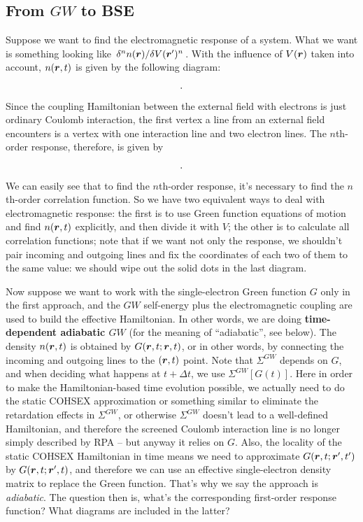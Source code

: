 \documentclass[hyperref, a4paper, 12pt]{report}
\newcommand*{\concept}[1]{{\textbf{#1}}}
\begin{document}
\subsection{From $GW$ to BSE}

Suppose we want to find the electromagnetic response of a system. 
What we want is something looking like $\fdv*[n]{n(\vb*{r})}{V(\vb*{r}')}$.
With the influence of $V(\vb*{r})$ taken into account, 
$n(\vb*{r}, t)$ is given by the following diagram: 
\[
    \protect.
\]
Since the coupling Hamiltonian between the external field with electrons 
is just ordinary Coulomb interaction, 
the first vertex a line from an external field encounters 
is a vertex with one interaction line and two electron lines.
The $n$th-order response, therefore, is given by 
\[
    \protect.
\]
We can easily see that to find the $n$th-order response,
it's necessary to find the $n$th-order correlation function.
So we have two equivalent ways to deal with electromagnetic response: 
the first is to use Green function equations of motion 
and find $n(\vb*{r}, t)$ explicitly,
and then divide it with $V$;
the other is to calculate all correlation functions;
note that if we want not only the response, 
we shouldn't pair incoming and outgoing lines 
and fix the coordinates of each two of them to the same value:
we should wipe out the solid dots in the last diagram.

Now suppose we want to work with the single-electron Green function $G$ only
in the first approach,
and the $GW$ self-energy plus the electromagnetic coupling 
are used to build the effective Hamiltonian. 
In other words, we are doing \concept{time-dependent adiabatic $GW$} 
(for the meaning of ``adiabatic'', see below).
The density $n(\vb*{r}, t)$ is obtained by $G(\vb*{r}, t; \vb*{r}, t)$,
or in other words, 
by connecting the incoming and outgoing lines to the $(\vb*{r}, t)$ point.
Note that $\Sigma^{GW}$ depends on $G$,
and when deciding what happens at $t + \Delta t$,
we use $\Sigma^{GW}[G(t)]$.
Here in order to make the Hamiltonian-based time evolution possible, 
we actually need to do the static COHSEX approximation or something similar 
to eliminate the retardation effects in $\Sigma^{GW}$,
or otherwise $\Sigma^{GW}$ doesn't lead to a well-defined Hamiltonian,
and therefore the screened Coulomb interaction line is no longer 
simply described by RPA
-- but anyway it relies on $G$.
Also, the locality of the static COHSEX Hamiltonian in time 
means we need to approximate $G(\vb*{r}, t; \vb*{r}', t')$
by $G(\vb*{r}, t; \vb*{r}', t)$,
and therefore we can use an effective single-electron density matrix 
to replace the Green function.
That's why we say the approach is \emph{adiabatic}.
The question then is, 
what's the corresponding first-order response function?
What diagrams are included in the latter? 
\end{document}
